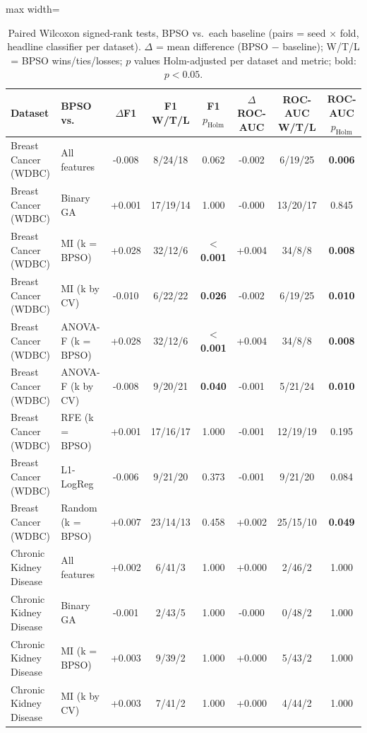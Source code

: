 \begin{table}[!t]
\centering
\caption{Paired Wilcoxon signed-rank tests, BPSO vs.\ each baseline (pairs = seed $\times$ fold, headline classifier per dataset). $\Delta$ = mean difference (BPSO $-$ baseline); W/T/L = BPSO wins/ties/losses; $p$ values Holm-adjusted per dataset and metric; bold: $p<0.05$.}
\label{tab:stats}
\footnotesize
\setlength{\tabcolsep}{4pt}
\begin{adjustbox}{max width=\linewidth}
\begin{tabular}{llcccccc}
\toprule
\textbf{Dataset} & \textbf{BPSO vs.} & \textbf{$\Delta$F1} & \textbf{F1 W/T/L} & \textbf{F1 $p_\mathrm{Holm}$} & \textbf{$\Delta$ROC-AUC} & \textbf{ROC-AUC W/T/L} & \textbf{ROC-AUC $p_\mathrm{Holm}$} \\
\midrule
Breast Cancer (WDBC) & All features & -0.008 & 8/24/18 & 0.062 & -0.002 & 6/19/25 & \textbf{0.006} \\
Breast Cancer (WDBC) & Binary GA & +0.001 & 17/19/14 & 1.000 & -0.000 & 13/20/17 & 0.845 \\
Breast Cancer (WDBC) & MI (k = BPSO) & +0.028 & 32/12/6 & \textbf{$<$0.001} & +0.004 & 34/8/8 & \textbf{0.008} \\
Breast Cancer (WDBC) & MI (k by CV) & -0.010 & 6/22/22 & \textbf{0.026} & -0.002 & 6/19/25 & \textbf{0.010} \\
Breast Cancer (WDBC) & ANOVA-F (k = BPSO) & +0.028 & 32/12/6 & \textbf{$<$0.001} & +0.004 & 34/8/8 & \textbf{0.008} \\
Breast Cancer (WDBC) & ANOVA-F (k by CV) & -0.008 & 9/20/21 & \textbf{0.040} & -0.001 & 5/21/24 & \textbf{0.010} \\
Breast Cancer (WDBC) & RFE (k = BPSO) & +0.001 & 17/16/17 & 1.000 & -0.001 & 12/19/19 & 0.195 \\
Breast Cancer (WDBC) & L1-LogReg & -0.006 & 9/21/20 & 0.373 & -0.001 & 9/21/20 & 0.084 \\
Breast Cancer (WDBC) & Random (k = BPSO) & +0.007 & 23/14/13 & 0.458 & +0.002 & 25/15/10 & \textbf{0.049} \\
Chronic Kidney Disease & All features & +0.002 & 6/41/3 & 1.000 & +0.000 & 2/46/2 & 1.000 \\
Chronic Kidney Disease & Binary GA & -0.001 & 2/43/5 & 1.000 & -0.000 & 0/48/2 & 1.000 \\
Chronic Kidney Disease & MI (k = BPSO) & +0.003 & 9/39/2 & 1.000 & +0.000 & 5/43/2 & 1.000 \\
Chronic Kidney Disease & MI (k by CV) & +0.003 & 7/41/2 & 1.000 & +0.000 & 4/44/2 & 1.000 \\

\end{tabular}
\end{adjustbox}
\end{table}
